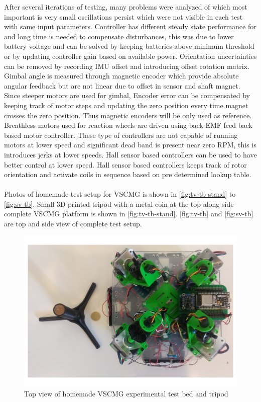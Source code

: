 After several iterations of testing, many problems were analyzed of which most important is very small oscillations persist which were not visible in each test with same input parameters. Controller has different steady state performance for and long time is needed to compensate disturbances, this was due to lower battery voltage and can be solved by keeping batteries above minimum threshold or by updating controller gain based on available power. Orientation uncertainties can be removed by recording IMU offset and introducing offset rotation matrix. Gimbal angle is measured through magnetic encoder which provide absolute angular feedback but are not linear due to offset in sensor and shaft magnet. Since steeper motors are used for gimbal, Encoder error can be compensated by keeping track of motor steps and updating the zero position every time magnet crosses the zero position. Thus magnetic encoders will be only used as reference. Breathless motors used for reaction wheels are driven using back EMF feed back based motor controller. These type of controllers are not capable of running motors at lower speed and significant dead band is present near zero RPM, this is introduces jerks at lower speeds. Hall sensor based controllers can be used to have better control at lower speed. Hall sensor based controllers keeps track of rotor orientation and activate coils in sequence based on pre determined lookup table.
\\
\\
Photos of homemade test setup for VSCMG is shown in \autoref{fig:tv-tb-stand} to \autoref{fig:sv-tb}. Small 3D printed tripod with a metal coin at the top along side complete VSCMG platform is shown in \autoref{fig:tv-tb-stand}. \autoref{fig:tv-tb} and \autoref{fig:sv-tb} are top and side view of complete test setup.

\begin{figure}
    \centering
    \includegraphics[width=\textwidth]{figures/photos/tb-stand-tv.pdf}
    \caption{Top view of homemade VSCMG experimental test bed and tripod}
    \label{fig:tv-tb-stand}
\end{figure}

